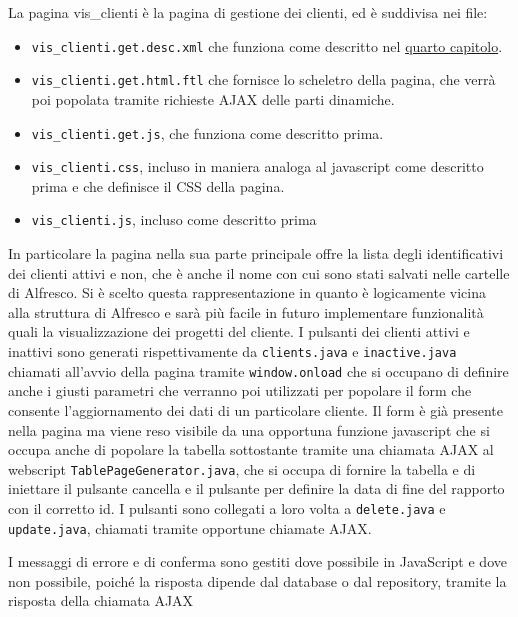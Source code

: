 La pagina vis\_clienti è la pagina di gestione dei clienti, ed è suddivisa nei file:
\begin{itemize}
\item \texttt{vis\_clienti.get.desc.xml} che funziona come descritto nel \hyperref[cap:architettura]{ quarto  capitolo}.
\item \texttt{vis\_clienti.get.html.ftl} che fornisce lo scheletro della pagina, che verrà poi popolata tramite richieste AJAX delle parti dinamiche.
\item \texttt{vis\_clienti.get.js}, che funziona come descritto prima.
\item \texttt{vis\_clienti.css}, incluso in maniera analoga al javascript come descritto prima e che definisce il CSS della pagina.
\item \texttt{vis\_clienti.js}, incluso come descritto prima
\end{itemize}
In particolare la pagina nella sua parte principale offre la lista degli identificativi dei clienti attivi e non, che è anche il nome con cui sono stati salvati nelle cartelle di Alfresco. Si è scelto questa rappresentazione in quanto è logicamente vicina alla struttura di Alfresco e sarà più facile in futuro implementare funzionalità quali la visualizzazione dei progetti del cliente.  I pulsanti dei clienti attivi e inattivi sono generati rispettivamente da \texttt{clients.java}  e  \texttt{inactive.java}  chiamati all’avvio della pagina tramite \texttt{window.onload} che si occupano di definire anche i giusti parametri che verranno poi utilizzati per popolare il form che consente l’aggiornamento dei dati di un particolare cliente. Il form è già presente nella pagina ma viene reso visibile da una opportuna funzione javascript che si occupa anche di popolare la tabella sottostante tramite una chiamata AJAX al webscript \texttt{TablePageGenerator.java}, che si occupa di fornire la tabella e di iniettare il pulsante cancella e il pulsante  per definire  la data di fine del rapporto  con il corretto id. I pulsanti sono collegati a loro volta a \texttt{delete.java} e \texttt{update.java}, chiamati tramite opportune chiamate AJAX.

I messaggi di errore e di conferma sono gestiti dove possibile in JavaScript e dove non possibile, poiché la risposta dipende dal database o dal repository, tramite la risposta della chiamata AJAX

